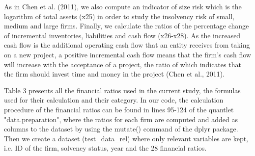\documentclass{article}
\begin{document}
 As in Chen et al. (2011), we also compute an indicator of size risk which is the logarithm of total assets (x25) in order to study the insolvency risk of small, medium and large firms. Finally, we calculate the ratios of the percentage change of incremental inventories, liabilities and cash flow (x26-x28). As the increased cash flow is the additional operating cash flow that an entity receives from taking on a new project, a positive incremental cash flow means that the firm's cash flow will increase with the acceptance of a project, the ratio of which indicates that the firm should invest time and money in the project (Chen et al., 2011). 
 
 Table 3 presents all the financial ratios used in the current study, the formulas used for their calculation and their category. In our code, the calculation procedure of the financial ratios can be found in lines 95-124 of the quantlet "data.preparation", where the ratios for each firm are computed and added as columns to the dataset by using the mutate() command of the dplyr package. Then we create a dataset (test\_data\_rel) where only relevant variables are kept, i.e. ID of the firm, solvency status, year and the 28 financial ratios. 
\end{document}
